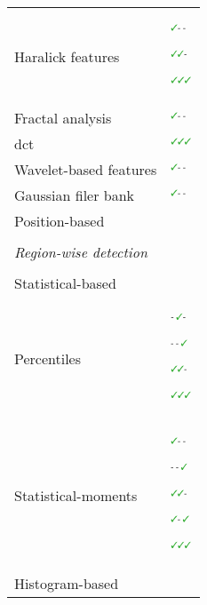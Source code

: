 \begin{table*}
\begin{threeparttable}
\begin{tabular}{p{.5\linewidth} p{.4\linewidth}}
      \quad \quad \quad Haralick features & $^{\text{{\cmarksmall}- -}}$\cite{Antic2013,Tiwari2009a,Tiwari2010,Tiwari2013,Viswanath2008,Viswanath2009,Viswanath2012}\par $^{\text{{\cmarksmall}{\cmarksmall}-}}$\cite{Viswanath2011}\par $^{\text{{\cmarksmall}{\cmarksmall}{\cmarksmall}}}$\cite{Litjens2012,Niaf2011,Niaf2012} \\
      \quad \quad \quad Fractal analysis & $^{\text{{\cmarksmall}- -}}$\cite{Lopes2011,Lv2009} \\
      \quad \quad \quad \Ac{dct} & $^{\text{{\cmarksmall}{\cmarksmall}{\cmarksmall}}}$\cite{Niaf2011,Niaf2012} \\
      \quad \quad \quad Wavelet-based features & $^{\text{{\cmarksmall}- -}}$\cite{Viswanath2012} \\
      \quad \quad \quad Gaussian filer bank & $^{\text{{\cmarksmall}- -}}$\cite{Litjens2014} \\ 
      \quad \quad Position-based & \cite{Chan2003,Litjens2011,Litjens2012,Litjens2014} \\ \\ [-1.5ex]
      \quad \textit{Region-wise detection} &  \\ \\ [-1.5ex]
      \quad \quad Statistical-based & \\
      \quad \quad \quad Percentiles & $^{\text{- {\cmarksmall}-}}$\cite{Vos2008a} \par $^{\text{- - {\cmarksmall}}}$\cite{Antic2013,Peng2013}\par $^{\text{{\cmarksmall}{\cmarksmall}-}}$\cite{Vos2010}\par $^{\text{{\cmarksmall}{\cmarksmall}{\cmarksmall}}}$\cite{Litjens2011,Litjens2012,Litjens2014,Niaf2011,Niaf2012,Vos2012} \\
      \quad \quad \quad Statistical-moments & $^{\text{{\cmarksmall}- -}}$\cite{Ampeliotis2007,Ampeliotis2008,Tiwari2009a,Tiwari2010,Tiwari2013,Viswanath2008,Viswanath2009,Viswanath2012}\par $^{\text{- - {\cmarksmall}}}$\cite{Antic2013}\par $^{\text{{\cmarksmall}{\cmarksmall}-}}$\cite{Viswanath2011}\par $^{\text{{\cmarksmall}- {\cmarksmall}}}$\cite{Peng2013}\par $^{\text{{\cmarksmall}{\cmarksmall}{\cmarksmall}}}$\cite{Litjens2011,Litjens2012,Litjens2014,Niaf2011,Niaf2012} \\
      \quad \quad Histogram-based & \\

\end{tabular}
\end{threeparttable}
\end{table*}
